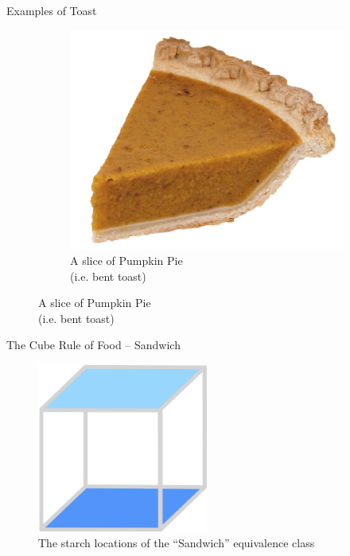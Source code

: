 \documentclass{beamer}
\begin{document}
\begin{frame}{Examples of Toast}
\begin{figure}
\begin{subfigure}{.4\textwidth}
        \end{subfigure}
        \begin{subfigure}{.4\textwidth}
          \centering
          \includegraphics[width=.7\linewidth]{images/cube_rule_of_food/toast/17_pumpkin_pie_slice.jpg}
          \caption{\label{fig:pumpkin-pie}A slice of Pumpkin Pie\\\quad\quad(i.e. bent toast)}
        \end{subfigure}
    \end{figure}
\end{frame}


\begin{frame}{The Cube Rule of Food -- Sandwich}
    \begin{figure}
        \includegraphics[width=0.5\textwidth]{images/cube_rule_of_food/sandwich/18_sandwich.jpg}
        \caption{\label{fig:sandwich-diagram}The starch locations of the ``Sandwich'' equivalence class}
    \end{figure}
\end{frame}
\end{document}
